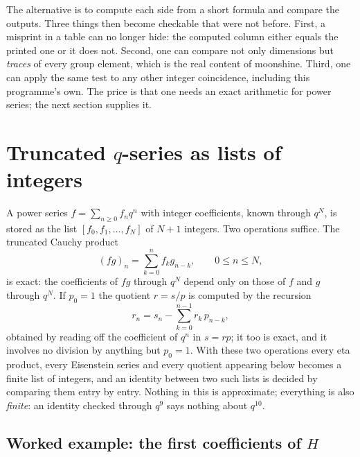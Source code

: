 The alternative is to compute each side from a short formula and compare the outputs.
Three things then become checkable that were not before. First, a misprint in a table can
no longer hide: the computed column either equals the printed one or it does not. Second,
one can compare not only dimensions but \emph{traces} of every group element, which is
the real content of moonshine. Third, one can apply the same test to any other integer
coincidence, including this programme's own. The price is that one needs an exact
arithmetic for power series; the next section supplies it.

\section{Truncated \texorpdfstring{$q$}{q}-series as lists of integers}\label{sec:moonshinecomputed:series}

A power series $f=\sum_{n\ge0}f_nq^n$ with integer coefficients, known through
$q^N$, is stored as the list $[f_0,f_1,\dots,f_N]$ of $N+1$ integers.
Two operations suffice. The truncated Cauchy product
\begin{equation}\label{eq:moonshinecomputed:mul}
  (fg)_n=\sum_{k=0}^{n}f_kg_{n-k},\qquad 0\le n\le N,
\end{equation}
is exact: the coefficients of $fg$ through $q^N$ depend only on those of $f$ and $g$
through $q^N$. If $p_0=1$ the quotient $r=s/p$ is computed by the recursion
\begin{equation}\label{eq:moonshinecomputed:div}
  r_n=s_n-\sum_{k=0}^{n-1}r_k\,p_{n-k},
\end{equation}
obtained by reading off the coefficient of $q^n$ in $s=rp$; it too is exact, and it
involves no division by anything but $p_0=1$. With these two operations every eta
product, every Eisenstein series and every quotient appearing below becomes a finite list
of integers, and an identity between two such lists is decided by comparing them entry by
entry. Nothing in this is approximate; everything is also \emph{finite}: an identity
checked through $q^9$ says nothing about $q^{10}$.

\subsection{Worked example: the first coefficients of \texorpdfstring{$H$}{H}}\label{sec:moonshinecomputed:worked}

